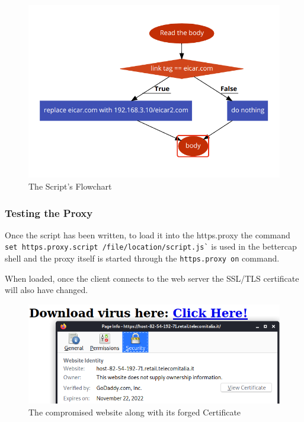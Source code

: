 \begin{figure}[h!]
 \centering
 \includegraphics[width=13cm]{img/script_flowchart.png}
 \caption{The Script's Flowchart}
 \label{fig: flowchart}
\end{figure}

\newpage

\subsubsection{Testing the Proxy}

Once the script has been written, to load it into the https.proxy the command \verb|set https.proxy.script /file/location/script.js`| is used in the bettercap shell and the proxy itself is started through the \verb|https.proxy on| command.

When loaded, once the client connects to the web server the SSL/TLS certificate will also have changed.

\begin{figure}[h!]
 \centering
 \includegraphics[width=13cm]{img/spoofed_certificate.png}
 \caption{The compromised website along with its forged Certificate}
 \label{fig: spoofed-certificate}
\end{figure}


